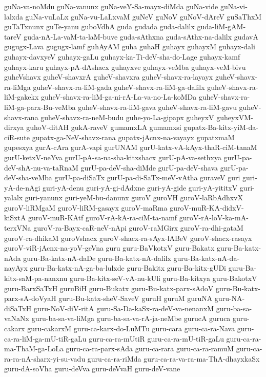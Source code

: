 {guNa-va-noMdu
guNa-vanunx
guNa-veY-Sa-mayx-diMda
guNa-vide
guNa-vi-lalxda
guNa-vuLaLx
guNa-vu-LaLxvaM
guNeV
guNoV
guNoV-dAreV
guSaThxM
guTaTxnunx
guTe-yanu
guboVdhA
guda
gudada
guda-dalilx
guda-liM-gAM-tareV
guda-nA-La-vaM-ta-laM-buve
guda-sAthxna
guda-sAthx-na-dalilx
gudavA
gugugx-Lava
gugugx-lamf
guhAyAM
guha
guhaH
guhayx
guhayxM
guhayx-dali
guhayx-davxyeV
guhayx-gaLu
guhayx-ka-Ti-deV-sha-do-Lage
guhayx-kamf
guhayx-karu
guhayx-pA-dAshacx
guhayxve
guhayx-veMba
guhayx-veM-bivu
guheVshavx
guheV-shavxrA
guheV-shavxra
guheV-shavx-ra-layayx
guheV-shavx-ra-liMga
guheV-shavx-ra-liM-gada
guheV-shavx-ra-liM-ga-dalilx
guheV-shavx-ra-liM-gakekx
guheV-shavx-ra-liM-ga-ni-rA-La-va-no-La-koMDa
guheV-shavx-ra-liM-ga-parx-Bu-veMba
guheV-shavx-ra-liM-gava
guheV-shavx-ra-liM-gavu
guheV-shavx-rana
guheV-shavx-ra-neM-budu
guhe-yo-La-gipapx
guheyxV
guheyxVM-dirxya
guhoV-ditAH
gukA-raveV
gumamxLA
gumamxsi
gupatx-Ba-kitx-yiM-da-ciR-sute
gupatx-ga-NeV-shavx-rana
gupatx-jAcnx-na-vayayx
gupatxmaM
gupesxya
gurA-cAra
gurA-vapi
gurUNAM
gurU-katx-vA-kAyx-thaR-ciM-tanaM
gurU-ketxV-neYva
gurU-pA-sa-na-sha-kitxshacx
gurU-pA-va-sethxya
gurU-pa-deV-shA-nu-va-taRnaM
gurU-pa-deV-sha-diMde
gurU-pa-deV-shava
gurU-pa-deV-sha-veMba
gurU-pa-diSaTx
gurU-pa-di-SaTx-meV-vAtha
guraveV
guri
guri-yA-de-nAgi
guri-yA-denu
guri-yA-gi-dAdxne
guri-yA-gide
guri-yA-yititxV
guri-yalalx
guri-yanunx
guri-yeM-bu-danunx
guroV
guroVH
guroV-laRbAdhxvX
guroV-liRMgaM
guroV-liRM-gasayx
guroV-maRma
guroV-muR-KA-didxV-kiSxtA
guroV-muR-KAtf
guroV-rA-kA-ra-ciM-ta-namf
guroV-rA-loV-ka-mA-terxVNa
guroV-ra-Bayx-caR-neV-nApi
guroV-raMGirx
guroV-ra-dhi-gataM
guroV-ra-dhikaM
guroVshacx
guroV-shacx-ra-sAyx-lABeV
guroV-shacx-rasayx
guroV-viR-jAcnx-na-yoV-geVna
guru
guru-BaVkotxV
guru-Bakatx
guru-Ba-katx-nAda
guru-Ba-katx-nA-daDe
guru-Ba-katx-nA-dalilx
guru-Ba-katx-nA-da-nayAyx
guru-Ba-katx-nA-ga-ba-lulxde
guru-Bakitx
guru-Ba-kitx-gUDi
guru-Ba-kitx-saM-pa-nanxnu
guru-Ba-kitx-seV-vA-nu-kUli
guru-Ba-kitxya
guru-BakotxV
guru-BarxSaTxH
guruBiH
guru-Bukatx
guru-Bu-katx-parx-sAdoV
guru-Bu-katx-parx-sA-doVyaH
guru-Bu-katx-sheV-SaveV
guruH
guruM
guruNA
guru-NA-diSaTxH
guru-NoV-diV-ritA
guru-Sa-Da-kaSx-ra-deV-va-nenanxM
guru-ba-sa-vaNaNx
guru-ba-sa-va-liMga
guru-ba-sa-va-rA-ja-neMbe
gurucA
guruca
guru-cakarx
guru-cakarxM
guru-ca-karx-do-LuMTu
guru-cara
guru-ca-ra-Nava
guru-ca-ra-liM-ga-mU-tiR-gaLu
guru-ca-ra-mUtiR
guru-ca-ra-mU-tiR-gaLu
guru-ca-ra-ma-ThaM-ga-LoLa
guru-ca-ra-parx-sAda
guru-ca-rara
guru-ca-ra-ramuM
guru-ca-ra-ra-nA-sharx-yi-su-vadu
guru-ca-ra-riMda
guru-ca-ra-va-ra-ma-ThA-dhayxkaSx
guru-dA-soVha
guru-deVva
guru-deVvaH
guru-deV-vane
}
